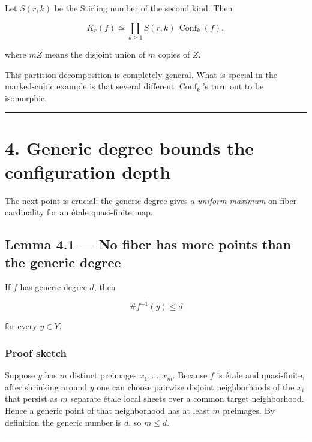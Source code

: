 Let \(S(r,k)\) be the Stirling number of the second kind. Then

\[
\boxed{
K_r(f)\simeq
\coprod_{k\ge1} S(r,k)\,\operatorname{Conf}_k(f),
}
\]

where \(mZ\) means the disjoint union of \(m\) copies of \(Z\).

This partition decomposition is completely general. What is special in
the marked-cubic example is that several different
\(\operatorname{Conf}_k\)'s turn out to be isomorphic.

\begin{center}\rule{0.5\linewidth}{0.5pt}\end{center}

\section{4. Generic degree bounds the configuration
depth}\label{generic-degree-bounds-the-configuration-depth}

The next point is crucial: the generic degree gives a \emph{uniform
maximum} on fiber cardinality for an étale quasi-finite map.

\subsection{Lemma 4.1 --- No fiber has more points than the generic
degree}\label{lemma-4.1-no-fiber-has-more-points-than-the-generic-degree}

If \(f\) has generic degree \(d\), then

\[
\#f^{-1}(y)\le d
\]

for every \(y\in Y\).

\subsubsection{Proof sketch}\label{proof-sketch}

Suppose \(y\) has \(m\) distinct preimages \(x_1,\dots,x_m\). Because
\(f\) is étale and quasi-finite, after shrinking around \(y\) one can
choose pairwise disjoint neighborhoods of the \(x_i\) that persist as
\(m\) separate étale local sheets over a common target neighborhood.
Hence a generic point of that neighborhood has at least \(m\) preimages.
By definition the generic number is \(d\), so \(m\le d\).

\begin{center}\rule{0.5\linewidth}{0.5pt}\end{center}

